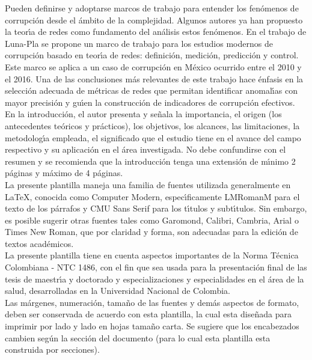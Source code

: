 Pueden definirse y adoptarse marcos de trabajo para entender los fen\'{o}menos de corrupci\'{o}n desde el \'{a}mbito de la complejidad. Algunos autores ya han propuesto la teor\'{\i}a de redes como fundamento del an\'{a}lisis estos fen\'{o}menos. En el trabajo de Luna-Pla \cite{luna2020corruption} se propone un marco de trabajo para los estudios modernos de corrupci\'{o}n basado en teor\'{\i}a de redes: definici\'{o}n, medici\'{o}n, predicci\'{o}n y control. Este marco se aplica a un caso de corrupci\'{o}n en M\'{e}xico ocurrido entre el 2010 y el 2016. Una de las conclusiones m\'{a}s relevantes de este trabajo hace \'{e}nfasis en la selecci\'{o}n adecuada de m\'{e}tricas de redes que permitan identificar anomal\'{\i}as con mayor precisi\'{o}n y gu\'{\i}en la construcci\'{o}n de indicadores de corrupci\'{o}n efectivos.\\






\iffalse
En la introducci\'{o}n, el autor presenta y se\~{n}ala la importancia, el origen (los antecedentes te\'{o}ricos y pr\'{a}cticos), los objetivos, los alcances, las limitaciones, la metodolog\'{\i}a empleada, el significado que el estudio tiene en el avance del campo respectivo y su aplicaci\'{o}n en el \'{a}rea investigada. No debe confundirse con el resumen y se recomienda que la introducci\'{o}n tenga una extensi\'{o}n de m\'{\i}nimo 2 p\'{a}ginas y m\'{a}ximo de 4 p\'{a}ginas.\\

La presente plantilla maneja una familia de fuentes utilizada generalmente en LaTeX, conocida como Computer Modern, espec\'{\i}ficamente LMRomanM para el texto de los p\'{a}rrafos y CMU Sans Serif para los t\'{\i}tulos y subt\'{\i}tulos. Sin embargo, es posible sugerir otras fuentes tales como Garomond, Calibri, Cambria, Arial o Times New Roman, que por claridad y forma, son adecuadas para la edici\'{o}n de textos acad\'{e}micos.\\

La presente plantilla tiene en cuenta aspectos importantes de la Norma T\'{e}cnica Colombiana - NTC 1486, con el fin que sea usada para la presentaci\'{o}n final de las tesis de maestr\'{\i}a y doctorado y especializaciones y especialidades en el \'{a}rea de la salud, desarrolladas en la Universidad Nacional de Colombia.\\

Las m\'{a}rgenes, numeraci\'{o}n, tama\~{n}o de las fuentes y dem\'{a}s aspectos de formato, deben ser conservada de acuerdo con esta plantilla, la cual esta dise\~{n}ada para imprimir por lado y lado en hojas tama\~{n}o carta. Se sugiere que los encabezados cambien seg\'{u}n la secci\'{o}n del documento (para lo cual esta plantilla esta construida por secciones).\\

